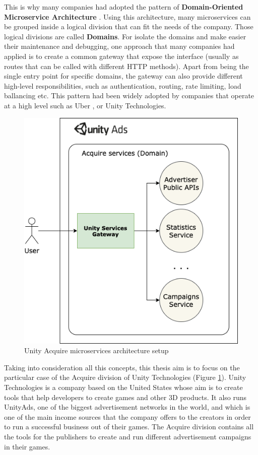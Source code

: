 \documentclass[12pt]{article}
\begin{document}
This is why many companies had adopted the pattern of \textbf{Domain-Oriented Microservice Architecture} \cite{DOMAUber}. Using this architecture, many microservices can be grouped inside a logical division that can fit the needs of the company. Those logical divisions are called \textbf{Domains}. For isolate the domains and make easier their maintenance and debugging, one approach that many companies had applied is to create a common gateway that expose the interface (usually as routes that can be called with different HTTP methods). Apart from being the single entry point for specific domains, the gateway can also provide different high-level responsibilities, such as authentication, routing, rate limiting, load ballancing etc. This pattern had been widely adopted by companies that operate at a high level such as Uber \cite{GatewayUber}, or Unity Technologies.\\

\begin{figure}[h]
    \centering
    \includegraphics[scale=0.35]{src/proposal/img/unity-services-diagram.png}
    \caption{Unity Acquire microservices architecture setup}
    \label{fig:unity-services-diagram}
\end{figure}

Taking into consideration all this concepts, this thesis aim is to focus on the particular case of the Acquire division of Unity Technologies (Figure \ref{fig:unity-services-diagram}). Unity Technologies is a company based on the United States whose aim is to create tools that help developers to create games and other 3D products. It also runs UnityAds, one of the biggest advertisement networks in the world, and which is one of the main income sources that the company offers to the creators in order to run a successful business out of their games. The Acquire division contains all the tools for the publishers to create and run different advertisement campaigns in their games.\\
\end{document}
